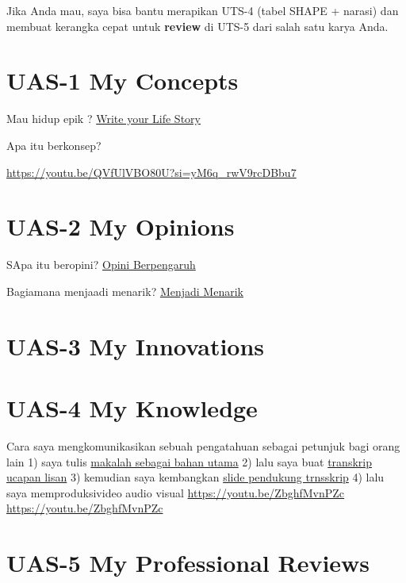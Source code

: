 \documentclass[
  letterpaper,
  DIV=11,
  numbers=noendperiod]{scrreprt}
\begin{document}
Jika Anda mau, saya bisa bantu merapikan UTS-4 (tabel SHAPE + narasi)
dan membuat kerangka cepat untuk \textbf{review} di UTS-5 dari salah
satu karya Anda.


\chapter{UAS-1 My Concepts}\label{uas-1-my-concepts}

Mau hidup epik ? \href{lifestory.pdf}{Write your Life Story}

Apa itu berkonsep?

\url{https://youtu.be/QVfUlVBO80U?si=yM6q_rwV9rcDBbu7}


\chapter{UAS-2 My Opinions}\label{uas-2-my-opinions}

SApa itu beropini? \href{BM\%20Opini.mp4}{Opini Berpengaruh}

Bagiamana menjaadi menarik? \href{./Interesting.mp4}{Menjadi Menarik}


\chapter{UAS-3 My Innovations}\label{uas-3-my-innovations}


\chapter{UAS-4 My Knowledge}\label{uas-4-my-knowledge}

Cara saya mengkomunikasikan sebuah pengatahuan sebagai petunjuk bagi
orang lain 1) saya tulis
\href{Rekomendasi\%20Presentasi\%20Efektif(Contoh\%20Makalah).pdf}{makalah
sebagai bahan utama} 2) lalu saya buat
\href{Contoh\%20Transkrip\%20Presentasi.pdf}{transkrip ucapan lisan} 3)
kemudian saya kembangkan
\href{Rekomendasi\%20Presentasi\%20(Contoh\%20Slides).pdf}{slide
pendukung trnsskrip} 4) lalu saya memproduksivideo audio visual
\url{https://youtu.be/ZbghfMvnPZc} \url{https://youtu.be/ZbghfMvnPZc}


\chapter{UAS-5 My Professional
Reviews}\label{uas-5-my-professional-reviews}
\end{document}
